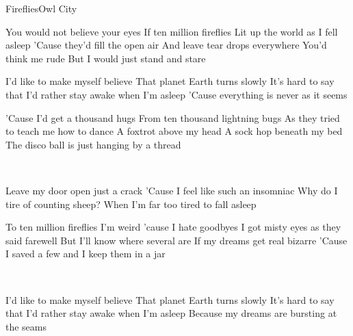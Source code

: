 \documentclass[a4paper,11pt,french]{article}
\begin{document}
\begin{Song}{Fireflies}{Owl City}

\begin{multicols}{2}
\begin{Verse}
You would not believe your eyes
If ten million fireflies
Lit up the world as I fell asleep
'Cause they'd fill the open air
And leave tear drops everywhere
You'd think me rude
But I would just stand and stare
\end{Verse}
\espaceInterStrophe

\begin{Chorus}
I'd like to make myself believe
That planet Earth turns slowly
It's hard to say that I'd rather stay awake when I'm asleep
'Cause everything is never as it seems
\end{Chorus}
\espaceInterStrophe

\begin{Verse}
'Cause I'd get a thousand hugs
From ten thousand lightning bugs
As they tried to teach me how to dance
A foxtrot above my head
A sock hop beneath my bed
The disco ball is just hanging by a thread
\end{Verse}
\espaceInterStrophe

\tochorus\\
\vfill
\columnbreak

\begin{Bridge}
Leave my door open just a crack
'Cause I feel like such an insomniac
Why do I tire of counting sheep?
When I'm far too tired to fall asleep
\end{Bridge}
\espaceInterStrophe

\begin{Verse}
To ten million fireflies
I'm weird 'cause I hate goodbyes
I got misty eyes as they said farewell
But I'll know where several are
If my dreams get real bizarre
'Cause I saved a few and I keep them in a jar
\end{Verse}
\espaceInterStrophe

\tochorus[x2]\\
\espaceInterStrophe

\begin{Chorus}
I'd like to make myself believe
That planet Earth turns slowly
It's hard to say that I'd rather stay awake when I'm asleep
Because my dreams are bursting at the seams
\end{Chorus}
\espaceInterStrophe
\end{multicols}
\vfill


\end{Song}
\end{document}
